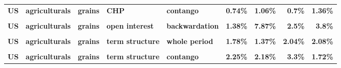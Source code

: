\documentclass[
  authoryear,
  preprint,
  3p]{elsarticle}
\begin{document}
\begin{landscape}
\begin{longtable}[t]{>{}l>{}l>{}l>{}l>{}l>{}r>{}r>{}r>{}r}
\textbf{US} & \textbf{agriculturals} & \textbf{grains} & \textbf{CHP} & \textbf{contango} & \textcolor[HTML]{4285f4}{\textbf{0.74\%}} & \textcolor[HTML]{4285f4}{\textbf{1.06\%}} & \textcolor[HTML]{4285f4}{\textbf{0.7\%}} & \textcolor[HTML]{4285f4}{\textbf{1.36\%}}\\
\textbf{\cellcolor{gray!10}{US}} & \textbf{\cellcolor{gray!10}{agriculturals}} & \textbf{\cellcolor{gray!10}{grains}} & \textbf{\cellcolor{gray!10}{open interest}} & \textbf{\cellcolor{gray!10}{whole period}} & \textcolor[HTML]{4285f4}{\textbf{\cellcolor{gray!10}{2.22\%}}} & \textcolor[HTML]{4285f4}{\textbf{\cellcolor{gray!10}{4.18\%}}} & \textcolor[HTML]{4285f4}{\textbf{\cellcolor{gray!10}{0.67\%}}} & \textcolor[HTML]{4285f4}{\textbf{\cellcolor{gray!10}{2.04\%}}}\\
\textbf{US} & \textbf{agriculturals} & \textbf{grains} & \textbf{open interest} & \textbf{backwardation} & \textcolor[HTML]{4285f4}{\textbf{1.38\%}} & \textcolor[HTML]{4285f4}{\textbf{7.87\%}} & \textcolor[HTML]{4285f4}{\textbf{2.5\%}} & \textcolor[HTML]{4285f4}{\textbf{3.8\%}}\\
\textbf{\cellcolor{gray!10}{US}} & \textbf{\cellcolor{gray!10}{agriculturals}} & \textbf{\cellcolor{gray!10}{grains}} & \textbf{\cellcolor{gray!10}{open interest}} & \textbf{\cellcolor{gray!10}{contango}} & \textcolor[HTML]{4285f4}{\textbf{\cellcolor{gray!10}{3.3\%}}} & \textcolor[HTML]{4285f4}{\textbf{\cellcolor{gray!10}{1.92\%}}} & \textcolor[HTML]{4285f4}{\textbf{\cellcolor{gray!10}{0.69\%}}} & \textcolor[HTML]{4285f4}{\textbf{\cellcolor{gray!10}{1.24\%}}}\\
\addlinespace
\textbf{US} & \textbf{agriculturals} & \textbf{grains} & \textbf{term structure} & \textbf{whole period} & \textcolor[HTML]{4285f4}{\textbf{1.78\%}} & \textcolor[HTML]{4285f4}{\textbf{1.37\%}} & \textcolor[HTML]{4285f4}{\textbf{2.04\%}} & \textcolor[HTML]{4285f4}{\textbf{2.08\%}}\\
\textbf{\cellcolor{gray!10}{US}} & \textbf{\cellcolor{gray!10}{agriculturals}} & \textbf{\cellcolor{gray!10}{grains}} & \textbf{\cellcolor{gray!10}{term structure}} & \textbf{\cellcolor{gray!10}{backwardation}} & \textcolor[HTML]{4285f4}{\textbf{\cellcolor{gray!10}{1.47\%}}} & \textcolor[HTML]{4285f4}{\textbf{\cellcolor{gray!10}{1.19\%}}} & \textcolor[HTML]{4285f4}{\textbf{\cellcolor{gray!10}{1.87\%}}} & \textcolor[HTML]{4285f4}{\textbf{\cellcolor{gray!10}{3.56\%}}}\\
\textbf{US} & \textbf{agriculturals} & \textbf{grains} & \textbf{term structure} & \textbf{contango} & \textcolor[HTML]{4285f4}{\textbf{2.25\%}} & \textcolor[HTML]{4285f4}{\textbf{2.18\%}} & \textcolor[HTML]{4285f4}{\textbf{3.3\%}} & \textcolor[HTML]{4285f4}{\textbf{1.72\%}}\\

\end{longtable}
\end{landscape}
\end{document}
